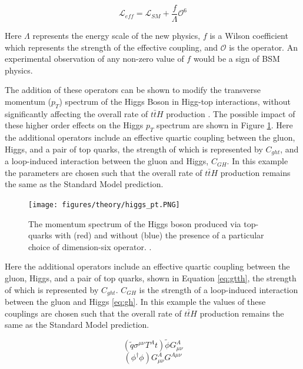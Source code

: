 \begin{equation}
\label{eq:dim6}
\mathcal{L}_{eff} = \mathcal{L}_{SM} + \frac{f}{\Lambda}\mathcal{O}^6
\end{equation}

Here $\Lambda$ represents the energy scale of the new physics, $f$ is a Wilson coefficient which represents the strength of the effective coupling, and $\mathcal{O}$ is the operator. An experimental observation of any non-zero value of $f$ would be a sign of BSM physics.

The addition of these operators can be shown to modify the transverse momentum ($p_T$) spectrum of the Higgs Boson in Higg-top interactions, without significantly affecting the overall rate of $t\bar{t}H$ production \cite{Banerjee_2014}. The possible impact of these higher order effects on the Higgs $p_T$ spectrum are shown in Figure \ref{fig:eft_pt}. Here the additional operators include an effective quartic coupling between the gluon, Higgs, and a pair of top quarks, the strength of which is represented by $C_{ght}$, and a loop-induced interaction between the gluon and Higgs, $C_{GH}$. In this example the parameters are chosen such that the overall rate of $t\bar{t}H$ production remains the same as the Standard Model prediction.

\begin{figure}[H]
\centering
   \texttt{[image: figures/theory/higgs\_pt.PNG]}
\caption{The momentum spectrum of the Higgs boson produced via top-quarks with (red) and without (blue) the presence of a particular choice of dimension-six operator.  \cite{Banerjee_2014}.}
\label{fig:eft_pt}
\end{figure}

Here the additional operators include an effective quartic coupling between the gluon, Higgs, and a pair of top quarks, shown in Equation \ref{eq:gtth}, the strength of which is represented by $C_{ght}$. $C_{GH}$ is the strength of a loop-induced interaction between the gluon and Higgs \ref{eq:gh}. In this example the values of these couplings are chosen such that the overall rate of $t\bar{t}H$ production remains the same as the Standard Model prediction.

\begin{equation}
\label{eq:gtth}
(\tilde{q}\sigma^{\mu\nu}T^At)\tilde{\phi}G^A_{\mu\nu}
\end{equation}
\begin{equation}
\label{eq:gh}
(\phi^\dagger\phi)G^A_{\mu\nu}G^{A\mu\nu}
\end{equation}


